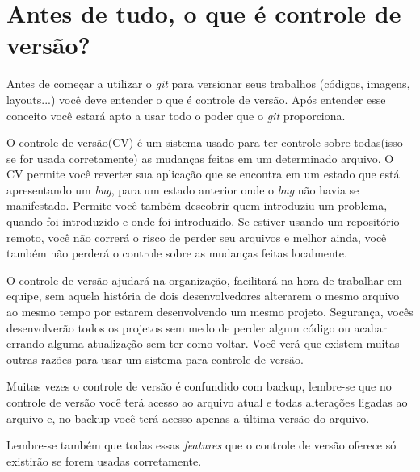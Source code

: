 \documentclass[12pt,openright,oneside,a4paper,english,brazil]{abntex2}
\begin{document}
	\frenchspacing 	
	
	\imprimircapa
	\imprimirfolhaderosto*
	
	
	\listoffigures*
	\cleardoublepage
	
	\tableofcontents*
	\cleardoublepage

\textual
	
	\chapter[Antes de tudo, o que é controle de versão?]{Antes de tudo, o que é controle de versão?}
Antes de começar a utilizar o \textit{git} para versionar seus trabalhos (códigos, imagens, layouts...) você deve entender o que é controle de versão. Após entender esse conceito você estará apto a usar todo o poder que o \textit{git} proporciona. 

O controle de versão(CV) é um sistema usado para ter controle sobre todas(isso se for usada corretamente) as mudanças feitas em um determinado arquivo. O CV permite você reverter sua aplicação que se encontra em um estado que está apresentando um \textit{bug}, para um estado anterior onde o \textit{bug} não havia se manifestado. Permite você também descobrir quem introduziu um problema, quando foi introduzido e onde foi introduzido. Se estiver usando um repositório remoto, você não correrá o risco de perder seu arquivos e melhor ainda, você também não perderá o controle sobre as mudanças feitas localmente. 

O controle de versão ajudará na organização, facilitará na hora de trabalhar em equipe, sem aquela história de dois desenvolvedores alterarem o mesmo arquivo ao mesmo tempo por estarem desenvolvendo um mesmo projeto. Segurança, vocês desenvolverão todos os projetos sem medo de perder algum código ou acabar errando alguma atualização sem ter como voltar. Você verá que existem muitas outras razões para usar um sistema para controle de versão.

Muitas vezes o controle de versão é confundido com backup, lembre-se que no controle de versão você terá acesso ao arquivo atual e todas alterações ligadas ao arquivo e, no backup você terá acesso apenas a última versão do arquivo.

Lembre-se também que todas essas \textit{features} que o controle de versão oferece só existirão se forem usadas corretamente.
\end{document}
